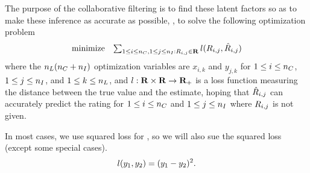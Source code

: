 The purpose of the collaborative filtering is to find these latent factors so as to make these inference
as accurate as possible,
\ie,
to solve the following optimization problem
\begin{equation}
\label{eq:mat-fac-form-1}
\begin{array}{ll}
\mbox{minimize} & \sum_{1\leq i\leq {n_C}, 1\leq j\leq {n_I}:R_{i,j} \in \mathbf{R}} l({R}_{i,j}, \hat{R}_{i,j})
\end{array}
\end{equation}
where the ${n_L}({n_C} + {n_I})$ optimization variables are $x_{i,k}$ and $y_{j,k}$
for $1\leq i\leq {n_C}$, $1\leq j\leq {n_I}$, and $1\leq k\leq {n_L}$,
and $l:\mathbf{R}\times\mathbf{R}\to{\mathbf{R}_+}$ is a loss function measuring the distance between the true value and the estimate,
hoping that $\hat{R}_{i,j}$ can accurately predict the rating for $1\leq i\leq {n_C}$ and $1\leq j\leq {n_I}$
where $R_{i,j}$ is not given.

In most cases, we use squared loss for \lfcn, so we will also sue the squared loss (except some special cases).
\begin{equation}
l(y_1, y_2) = (y_1 - y_2)^2.
\end{equation}

